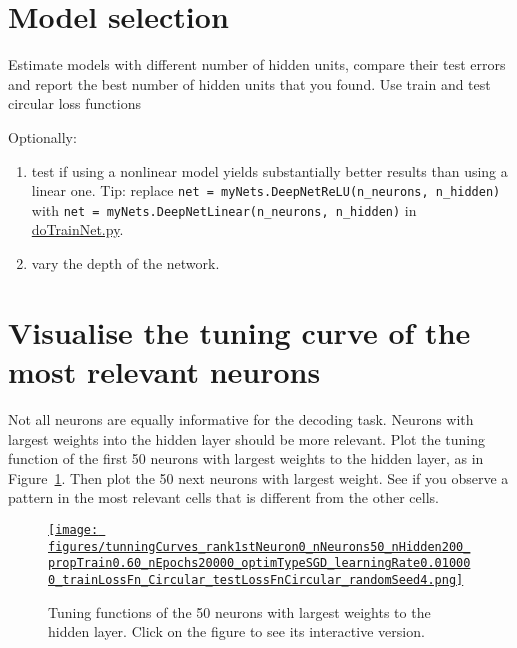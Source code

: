 \documentclass[12pt]{article}
\begin{document}
\section{Model selection}

Estimate models with different number of hidden units, compare their test
errors and report the best number of hidden units that you found. Use train and
test circular loss functions

Optionally:

\begin{enumerate}

    \item test if using a nonlinear model yields substantially better results
        than using a linear one. Tip: replace \texttt{net =
        myNets.DeepNetReLU(n\_neurons, n\_hidden)} with \texttt{net =
        myNets.DeepNetLinear(n\_neurons, n\_hidden)} in
        \href{https://github.com/joacorapela/statNeuro2025/blob/master/worksheets/08_artificialNeuralNetworks/code/scripts/doTrainNet.py}{doTrainNet.py}.

    \item vary the depth of the network.

\end{enumerate}

\section{Visualise the tuning curve of the most relevant neurons}

Not all neurons are equally informative for the decoding task. Neurons with
largest weights into the hidden layer should be more relevant. Plot the tuning
function of the first 50 neurons with largest weights to the hidden layer, as
in Figure~\ref{fig:tunningFunctionsFirst50}. Then plot the 50 next neurons with largest weight. See if
you observe a pattern in the most relevant cells that is different from the
other cells.

\begin{figure}[H]
    \begin{center}
        \href{https://www.gatsby.ucl.ac.uk/~rapela/statNeuro/2025/worksheets/08_artificialNeuralNetworks/figures/tunningCurves_rank1stNeuron0_nNeurons50_nHidden200_propTrain0.60_nEpochs20000_optimTypeSGD_learningRate0.010000_trainLossFn_Circular_testLossFnCircular_randomSeed4.html}{\texttt{[image: figures/tunningCurves\_rank1stNeuron0\_nNeurons50\_nHidden200\_propTrain0.60\_nEpochs20000\_optimTypeSGD\_learningRate0.010000\_trainLossFn\_Circular\_testLossFnCircular\_randomSeed4.png]}}

        \caption{Tuning functions of the 50 neurons with largest weights to the
        hidden layer. Click on the figure to see its interactive version.}

        \label{fig:tunningFunctionsFirst50}
    \end{center}
\end{figure}
\end{document}
